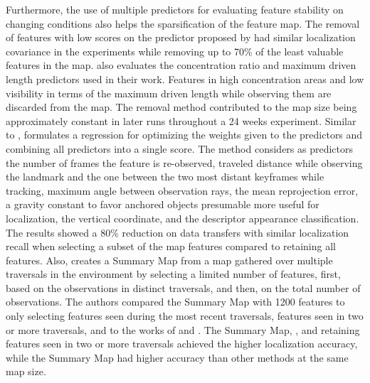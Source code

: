 Furthermore, the use of multiple predictors for evaluating feature stability on changing conditions also helps the sparsification of the feature map.
The removal of features with low scores on the predictor proposed by \cite{berrio-et-al:2019:8814289} had similar localization covariance in the experiments while removing up to 70\% of the least valuable features in the map.
\cite{berrio-et-al:2021:3094485} also evaluates the concentration ratio and maximum driven length predictors used in their work. Features in high concentration areas and low visibility in terms of the maximum driven length while observing them are discarded from the map. The removal method contributed to the map size being approximately constant in later runs throughout a 24 weeks experiment.
Similar to \cite{berrio-et-al:2019:8814289}, \cite{dymczyk-et-al:2016:7759673} formulates a regression for optimizing the weights given to the predictors and combining all predictors into a single score. The method considers as predictors the number of frames the feature is re-observed, traveled distance while observing the landmark and the one between the two most distant keyframes while tracking, maximum angle between observation rays, the mean reprojection error, a gravity constant to favor anchored objects presumable more useful for localization, the vertical coordinate, and the descriptor appearance classification. The results showed a 80\% reduction on data transfers with similar localization recall when selecting a subset of the map features compared to retaining all features.
Also, \cite{mühlfellner-et-al:2016:21595} creates a Summary Map from a map gathered over multiple traversals in the environment by selecting a limited number of features, first, based on the observations in distinct traversals, and then, on the total number of observations. The authors compared the Summary Map with 1200 features to only selecting features seen during the most recent traversals, features seen in two or more traversals, and to the works of \cite{konolige-bowman:2009:5354121} and \cite{dayoub-et-al:2011:013}. The Summary Map, \cite{konolige-bowman:2009:5354121}, and retaining features seen in two or more traversals achieved the higher localization accuracy, while the Summary Map had higher accuracy than other methods at the same map size.

